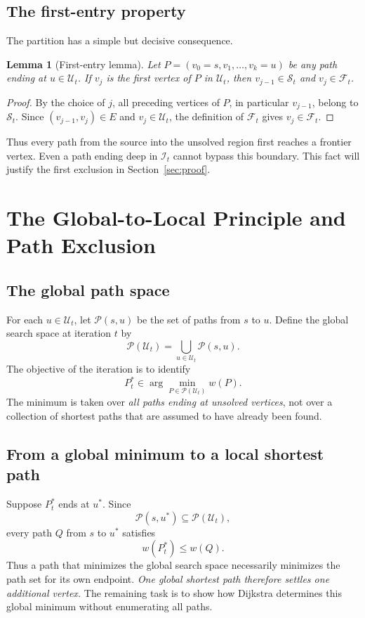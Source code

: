 \documentclass[11pt]{article}
\newtheorem{lemma}{Lemma}
\newcommand{\Sset}{\mathcal{S}_t}
\newcommand{\Uset}{\mathcal{U}_t}
\newcommand{\Fset}{\mathcal{F}_t}
\newcommand{\Iset}{\mathcal{I}_t}
\newcommand{\PathU}{\mathcal{P}(\mathcal{U}_t)}
\begin{document}
\subsection{The first-entry property}
The partition has a simple but decisive consequence.

\begin{lemma}[First-entry lemma]\label{lem:firstentry}
Let $P=(v_0=s,v_1,\ldots,v_k=u)$ be any path ending at $u\in\Uset$. If $v_j$ is the first vertex of $P$ in $\Uset$, then $v_{j-1}\in\Sset$ and $v_j\in\Fset$.
\end{lemma}
\begin{proof}
By the choice of $j$, all preceding vertices of $P$, in particular $v_{j-1}$, belong to $\Sset$. Since $(v_{j-1},v_j)\in E$ and $v_j\in\Uset$, the definition of $\Fset$ gives $v_j\in\Fset$.
\end{proof}

Thus every path from the source into the unsolved region first reaches a frontier vertex. Even a path ending deep in $\Iset$ cannot bypass this boundary. This fact will justify the first exclusion in Section~\ref{sec:proof}.

\section{The Global-to-Local Principle and Path Exclusion}
\label{sec:principle}
\subsection{The global path space}
For each $u\in\Uset$, let $\mathcal P(s,u)$ be the set of paths from $s$ to $u$. Define the global search space at iteration $t$ by
\[
  \PathU=\bigcup_{u\in\Uset}\mathcal P(s,u).
\]
The objective of the iteration is to identify
\[
  P_t^*\in\arg\min_{P\in\PathU}w(P).
\]
The minimum is taken over \emph{all paths ending at unsolved vertices}, not over a collection of shortest paths that are assumed to have already been found.

\subsection{From a global minimum to a local shortest path}
Suppose $P_t^*$ ends at $u^*$. Since
\[
  \mathcal P(s,u^*)\subseteq\PathU,
\]
every path $Q$ from $s$ to $u^*$ satisfies
\[
  w(P_t^*)\le w(Q).
\]
Thus a path that minimizes the global search space necessarily minimizes the path set for its own endpoint. \emph{One global shortest path therefore settles one additional vertex.} The remaining task is to show how Dijkstra determines this global minimum without enumerating all paths.
\end{document}
